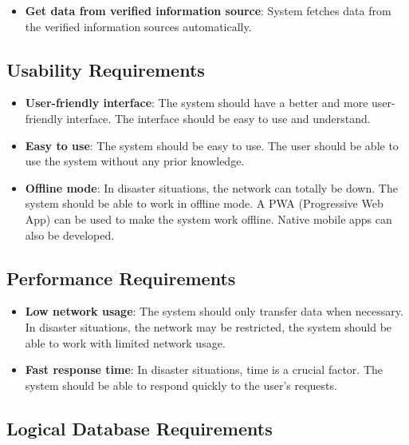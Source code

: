 \documentclass[a4paper]{article}
\begin{document}
        \begin{itemize}
            \item \textbf{Get data from verified information source}: System fetches data from the verified information sources automatically.
        \end{itemize}

        \subsection{Usability Requirements}
    
        \begin{itemize}
            \item \textbf{User-friendly interface}: The system should have a better and more user-friendly interface. The interface should be easy to use and understand.
            \item \textbf{Easy to use}: The system should be easy to use. The user should be able to use the system without any prior knowledge.
            \item \textbf{Offline mode}: In disaster situations, the network can totally be down. The system should be able to work in offline mode. A PWA (Progressive Web App) can be used to make the system work offline. Native mobile apps can also be developed.
        \end{itemize}
        
        \subsection{Performance Requirements}
        
        \begin{itemize}
            \item \textbf{Low network usage}: The system should only transfer data when necessary. In disaster situations, the network may be restricted, the system should be able to work with limited network usage.
            \item \textbf{Fast response time}: In disaster situations, time is a crucial factor. The system should be able to respond quickly to the user's requests.
        \end{itemize}
        
        \subsection{Logical Database Requirements}
\end{document}
